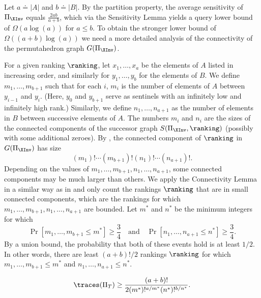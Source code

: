 Let $a\doteq |A|$ and $b\doteq |B|$. By the partition property, the average sensitivity of $\Pi_{\XInv}$ equals $\frac{2ab}{a+b}$, which via the Sensitivity Lemma yields a query lower bound of $\Omega(a \log(a))$ for $a \le b$. To obtain the stronger lower bound of $\Omega((a+b)\log(a))$ we need a more detailed analysis of the connectivity of the permutahedron graph $G(\Pi_{\XInv})$. 

For a given ranking $\ranking$, let $x_1,\dots,x_{a}$ be the elements of $A$ listed in increasing order, and similarly for $y_1,\dots,y_b$ for the elements of $B$. We define $m_1,\dots,m_{b+1}$ such that for each $i$, $m_i$ is the number of elements of $A$ between $y_{i-1}$ and $y_i$. (Here, $y_0$ and $y_{b+1}$ serve as sentinels with an infinitely low and infinitely high rank.) Similarly, we define $n_1,\dots,n_{a+1}$ as the number of elements in $B$ between successive elements of $A$. The numbers $m_i$ and $n_i$ are the sizes of the connected components of the successor graph $S(\Pi_{\XInv},\ranking)$ (possibly with some additional zeroes). By , the connected component of $\ranking$ in $G(\Pi_{\XInv})$ has size
\begin{equation}
    \label{eq:mann-whitney:cc-size}
    (m_1)!\cdots (m_{b+1})!(n_1)!\cdots (n_{a+1})!.
\end{equation}
Depending on the values of $m_1,\dots,m_{b+1},n_1,\dots,n_{a+1}$, some connected components may be much larger than others. We apply the Connectivity Lemma in a similar way as in  and only count the rankings $\ranking$ that are in small connected components, which are the rankings for which $m_1,\dots,m_{b+1},n_1,\dots,n_{a+1}$ are bounded. Let $m^*$ and $n^*$ be the minimum integers for which 
\begin{equation*}
    \Pr[m_1,\dots,m_{b+1} \le m^*] \ge \frac{3}{4}\quad\text{and}\quad
    \Pr[n_1,\dots,n_{a+1} \le n^*] \ge \frac{3}{4}.
\end{equation*}
By a union bound, the probability that both of these events hold is at least $1/2$. In other words, there are least $(a+b)!/2$ rankings $\ranking$ for which $m_1,\dots,m_{b+1}\le m^*$ and $n_1,\dots,n_{a+1}\le n^*$.
\begin{proposition}\label{prop:mann-whitney:cc-bound}
    \begin{equation}\label{eq:mann-whitney:cc-bound}
        \traces(\Pi_T) \ge \frac{(a+b)!}{2(m^*)!^{a/m^*}(n^*)!^{b/n^*}}.
    \end{equation}
\end{proposition}

